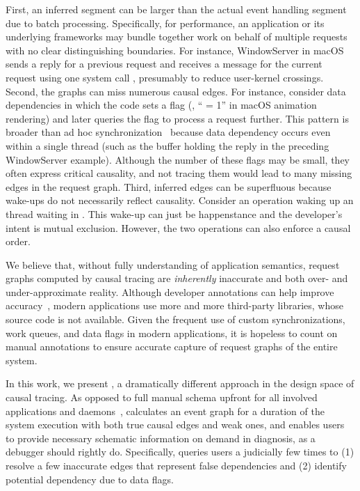 First, an inferred segment can be larger than the actual event handling segment
due to batch processing. Specifically, for performance, an application or its
underlying frameworks may bundle together work on behalf of multiple requests
with no clear distinguishing boundaries. For instance, WindowServer in macOS
sends a reply for a previous request and receives a message for the current
request using one system call , presumably to
reduce user-kernel crossings. Second, the graphs can miss numerous causal
edges. For instance, consider data dependencies in which the code sets a flag
(\eg, `` = 1'' in macOS animation rendering) and later
queries the flag to process a request further. This pattern is broader than
ad hoc synchronization~\cite{xiong2010ad} because data dependency occurs
even within a single thread (such as the buffer holding the reply in the
preceding WindowServer example). Although the number of these flags may be
small, they often express critical causality, and not tracing them would lead
to many missing edges in the request graph. Third, inferred edges can be
superfluous because wake-ups do not necessarily reflect
causality. Consider an  operation waking up an thread waiting
in . This wake-up can just be happenstance and the developer's
intent is mutual exclusion. However, the two operations can also enforce a
causal order.

We believe that, without fully understanding of application semantics, request
graphs computed by causal tracing are \emph{inherently} inaccurate and both
over- and under-approximate reality. Although developer annotations can help
improve accuracy~\cite{reynolds2006pip, fonseca2007x}, modern applications use
more and more third-party libraries, whose source code is not available. Given
the frequent use of custom synchronizations, work queues, and data flags in
modern applications, it is hopeless to count on manual annotations to ensure
accurate capture of request graphs of the entire system.

In this work, we present \xxx, a dramatically different approach in the design
space of causal tracing. As opposed to full manual schema upfront for
all involved applications and daemons~\cite{barham2004using, reynolds2006pip,
fonseca2007x}, \xxx calculates an event graph for a duration of the system
execution with both true causal edges and weak ones, and enables users to
provide necessary schematic information on demand in diagnosis,
as a debugger should rightly do. Specifically, \xxx queries users a
judicially few times to (1) resolve a few inaccurate edges that represent false
dependencies and (2) identify potential dependency due to data flags.


